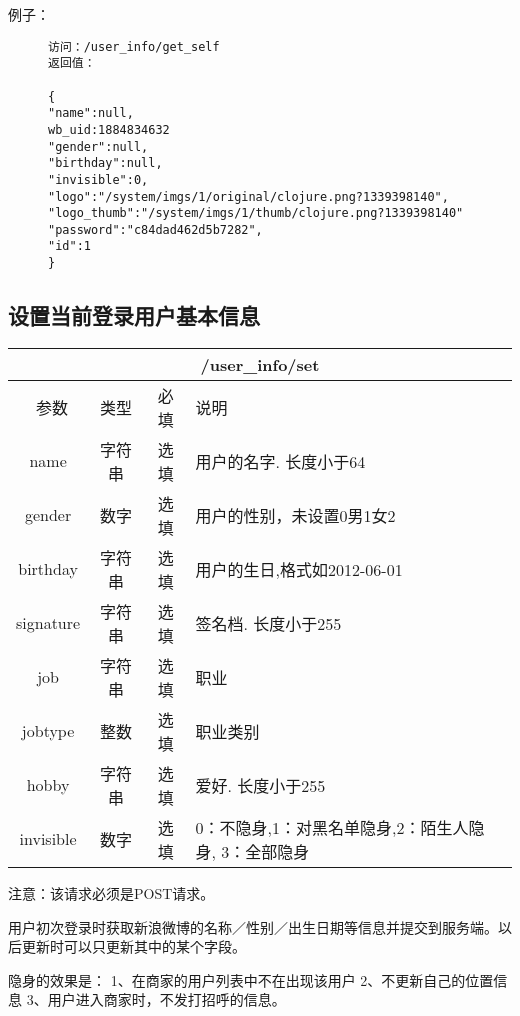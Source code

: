 \documentclass[cs4size]{ctexartutf8}
\begin{document}
例子：

\begin{figure}[H]
\begin{verbatim}
访问：/user_info/get_self
返回值：

{
"name":null,
wb_uid:1884834632
"gender":null,
"birthday":null,
"invisible":0,
"logo":"/system/imgs/1/original/clojure.png?1339398140",
"logo_thumb":"/system/imgs/1/thumb/clojure.png?1339398140"
"password":"c84dad462d5b7282",
"id":1
}

\end{verbatim}
\end{figure}



\subsection{设置当前登录用户基本信息}

\begin{table}[H]
   \begin{center}
\begin{tabular}{|c|c|c|p{12cm}|}
\hline
\multicolumn{4}{|c|}{/user\_info/set} \\
\hline\hline
 \  参数  & 类型 & 必填 &  说明  \\
\hline
 name  & 字符串 & 选填 &  用户的名字. 长度小于64\\
\hline
 gender  & 数字 & 选填 &  用户的性别，未设置0男1女2\\
\hline
 birthday  & 字符串 & 选填 &  用户的生日,格式如2012-06-01\\
 \hline
 signature  & 字符串 & 选填 &  签名档. 长度小于255\\
 \hline
 job  & 字符串 & 选填 &  职业\\
 \hline
 jobtype  & 整数 & 选填 &  职业类别\\
 \hline
 hobby  & 字符串 & 选填 &  爱好. 长度小于255\\
 \hline
 invisible  & 数字 & 选填 &  0：不隐身,1：对黑名单隐身,2：陌生人隐身, 3：全部隐身\\
\hline
\end{tabular}
   \end{center}
\end{table}

注意：该请求必须是POST请求。

用户初次登录时获取新浪微博的名称／性别／出生日期等信息并提交到服务端。以后更新时可以只更新其中的某个字段。

隐身的效果是：
1、在商家的用户列表中不在出现该用户
2、不更新自己的位置信息
3、用户进入商家时，不发打招呼的信息。
\end{document}
